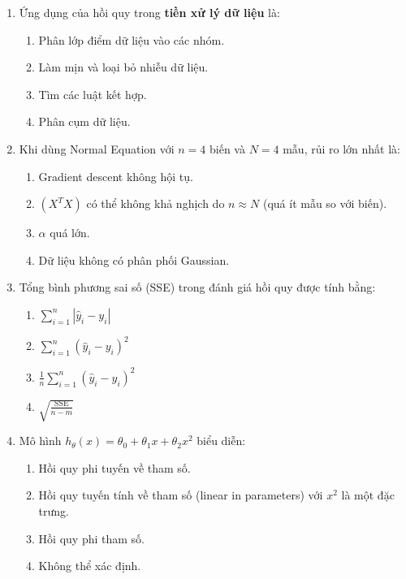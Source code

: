 \documentclass[10pt]{article}
\begin{document}
\begin{enumerate}[leftmargin=*, label=\textbf{Câu \arabic*.}]
    \item Ứng dụng của hồi quy trong \textbf{tiền xử lý dữ liệu} là:
    \begin{enumerate}[label=\Alph*.]
        \item Phân lớp điểm dữ liệu vào các nhóm.
        \item Làm mịn và loại bỏ nhiễu dữ liệu.
        \item Tìm các luật kết hợp.
        \item Phân cụm dữ liệu.
    \end{enumerate}

    \item Khi dùng Normal Equation với $n = 4$ biến và $N = 4$ mẫu, rủi ro lớn nhất là:
    \begin{enumerate}[label=\Alph*.]
        \item Gradient descent không hội tụ.
        \item $(X^TX)$ có thể không khả nghịch do $n \approx N$ (quá ít mẫu so với biến).
        \item $\alpha$ quá lớn.
        \item Dữ liệu không có phân phối Gaussian.
    \end{enumerate}

    \item Tổng bình phương sai số (SSE) trong đánh giá hồi quy được tính bằng:
    \begin{enumerate}[label=\Alph*.]
        \item $\sum_{i=1}^{n} |\hat{y}_i - y_i|$
        \item $\sum_{i=1}^{n} (\hat{y}_i - y_i)^2$
        \item $\frac{1}{n}\sum_{i=1}^{n}(\hat{y}_i - y_i)^2$
        \item $\sqrt{\frac{\text{SSE}}{n-m}}$
    \end{enumerate}

    \item Mô hình $h_\theta(x) = \theta_0 + \theta_1 x + \theta_2 x^2$ biểu diễn:
    \begin{enumerate}[label=\Alph*.]
        \item Hồi quy phi tuyến về tham số.
        \item Hồi quy tuyến tính về tham số (linear in parameters) với $x^2$ là một đặc trưng.
        \item Hồi quy phi tham số.
        \item Không thể xác định.
    \end{enumerate}


\end{enumerate}
\end{document}
